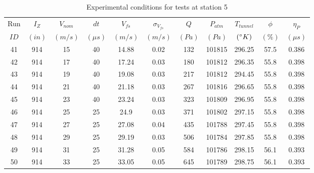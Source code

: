 \begin{table}[H]
\begin{center}
\begin{tabular}{|ccccccccccc|}
	\hline
	Run & $I_Z$ & $V_{nom}$ & $dt$ & $V_{fs}$ & $\sigma_{V_{fs}}$ & $Q$ & $P_{atm}$ & $T_{tunnel}$ & $\phi$ & $\eta_P$\\
	$ID$ & $(in)$ & $(m/s)$ & $(\mu s)$ & $(m/s)$ & $(m/s)$ & $(Pa)$ & $(Pa)$ & $(\degree K)$ & $(\%)$ & $(\mu s)$\\
	\hline
	41 & 914 & 15 & 40 & 14.88 & 0.02 & 132 & 101815 & 296.25 & 57.5 & 0.386\\
	42 & 914 & 17 & 40 & 17.24 & 0.03 & 180 & 101812 & 296.35 & 55.8 & 0.398\\
	43 & 914 & 19 & 40 & 19.08 & 0.03 & 217 & 101812 & 294.45 & 55.8 & 0.398\\
	44 & 914 & 21 & 40 & 21.18 & 0.03 & 267 & 101816 & 296.65 & 55.8 & 0.398\\
	45 & 914 & 23 & 40 & 23.24 & 0.03 & 323 & 101809 & 296.95 & 55.8 & 0.398\\
	46 & 914 & 25 & 25 & 24.9 & 0.03 & 371 & 101802 & 297.15 & 55.8 & 0.398\\
	47 & 914 & 27 & 25 & 27.08 & 0.04 & 435 & 101788 & 297.45 & 55.8 & 0.398\\
	48 & 914 & 29 & 25 & 29.19 & 0.03 & 506 & 101784 & 297.85 & 55.8 & 0.398\\
	49 & 914 & 31 & 25 & 31.28 & 0.05 & 584 & 101786 & 298.15 & 56.1 & 0.393\\
	50 & 914 & 33 & 25 & 33.05 & 0.05 & 645 & 101789 & 298.75 & 56.1 & 0.393\\
	\hline
\end{tabular}
\caption{Experimental conditions for tests at station 5}
\label{table:station_5_measurements}
\end{center}
\end{table}
